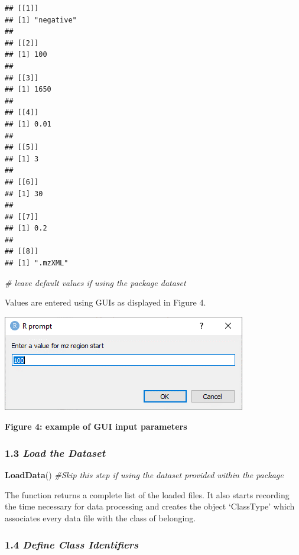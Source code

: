 \documentclass[
]{article}
\newenvironment{Shaded}{\begin{snugshade}}{\end{snugshade}}
\newcommand{\CommentTok}[1]{\textcolor[rgb]{0.56,0.35,0.01}{\textit{#1}}}
\newcommand{\KeywordTok}[1]{\textcolor[rgb]{0.13,0.29,0.53}{\textbf{#1}}}
\newcommand{\NormalTok}[1]{#1}
\begin{document}
\begin{verbatim}
## [[1]]
## [1] "negative"
## 
## [[2]]
## [1] 100
## 
## [[3]]
## [1] 1650
## 
## [[4]]
## [1] 0.01
## 
## [[5]]
## [1] 3
## 
## [[6]]
## [1] 30
## 
## [[7]]
## [1] 0.2
## 
## [[8]]
## [1] ".mzXML"
\end{verbatim}

\begin{Shaded}
\begin{Highlighting}[]
\CommentTok{\# leave default values if using the package dataset}
\end{Highlighting}
\end{Shaded}

Values are entered using GUIs as displayed in Figure 4.

\includegraphics{./massspecparam.png}

\textbf{Figure 4: example of GUI input parameters}

\hypertarget{load-the-dataset}{%
\subsubsection{\texorpdfstring{1.3 \emph{Load the
Dataset}}{1.3 Load the Dataset}}\label{load-the-dataset}}

\begin{Shaded}
\begin{Highlighting}[]
\KeywordTok{LoadData}\NormalTok{()}
\CommentTok{\#Skip this step if using the dataset provided within the package }
\end{Highlighting}
\end{Shaded}

The function returns a complete list of the loaded files. It also starts
recording the time necessary for data processing and creates the object
`ClassType' which associates every data file with the class of
belonging.

\hypertarget{define-class-identifiers}{%
\subsubsection{\texorpdfstring{1.4 \emph{Define Class
Identifiers}}{1.4 Define Class Identifiers}}\label{define-class-identifiers}}
\end{document}
